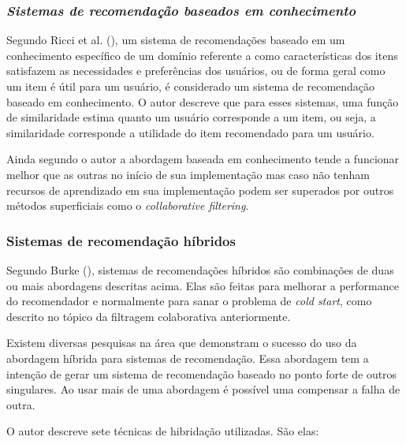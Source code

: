 \subsubsection{\textit{Sistemas de recomendação baseados em conhecimento}}

Segundo Ricci et al. (\citeyear{Ricci:2010}), um sistema de recomendações baseado em um conhecimento específico de um domínio referente a como características dos itens satisfazem as necessidades e preferências dos usuários, ou de forma geral como um item é útil para um usuário, é considerado um sistema de recomendação baseado em conhecimento. O autor descreve que para esses sistemas, uma função de similaridade estima quanto um usuário corresponde a um item, ou seja, a similaridade corresponde a utilidade do item recomendado para um usuário.

Ainda segundo o autor a abordagem baseada em conhecimento tende a funcionar melhor que as outras no início de sua implementação mas caso não tenham recursos de aprendizado em sua implementação podem ser superados por outros métodos superficiais como o \textit{collaborative filtering}.

\subsubsection{Sistemas de recomendação híbridos}
\label{Hybrid}
Segundo Burke (\citeyear{Burke:2007}), sistemas de recomendações híbridos são combinações de duas ou mais abordagens descritas acima. Elas são feitas para melhorar a performance do recomendador e normalmente para sanar o problema de \textit{cold start}, como descrito no tópico da filtragem colaborativa anteriormente.

Existem diversas pesquisas na área que demonstram o sucesso do uso da abordagem híbrida para sistemas de recomendação. Essa abordagem tem a intenção de gerar um sistema de recomendação baseado no ponto forte de outros singulares. Ao usar mais de uma abordagem é possível uma compensar a falha de outra.

O autor descreve sete técnicas de hibridação utilizadas. São elas:

